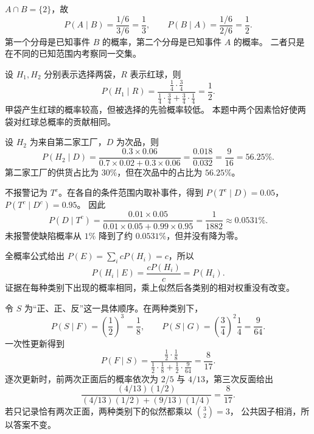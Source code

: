 \documentclass[UTF8]{ctexart}
\begin{document}
\begin{solve}
$A\cap B=\{2\}$，故
\[
  P(A\mid B)=\frac{1/6}{3/6}=\frac13,
  \qquad P(B\mid A)=\frac{1/6}{2/6}=\frac12.
\]
第一个分母是已知事件 $B$ 的概率，第二个分母是已知事件 $A$ 的概率。
二者只是在不同的已知范围内考察同一交集。
\end{solve}

\begin{solve}
设 $H_1,H_2$ 分别表示选择两袋，$R$ 表示红球，则
\[
  P(H_1\mid R)
  =\frac{\frac14\cdot\frac34}
  {\frac14\cdot\frac34+\frac34\cdot\frac14}=\frac12.
\]
甲袋产生红球的概率较高，但被选择的先验概率较低。
本题中两个因素恰好使两袋对红球总概率的贡献相同。
\end{solve}

\begin{solve}
设 $H_2$ 为来自第二家工厂，$D$ 为次品，则
\[
  P(H_2\mid D)
  =\frac{0.3\times0.06}{0.7\times0.02+0.3\times0.06}
  =\frac{0.018}{0.032}=\frac9{16}=56.25\%.
\]
第二家工厂的供货占比为 $30\%$，但在次品中的占比为 $56.25\%$。
\end{solve}

\begin{solve}
不报警记为 $T^c$。在各自的条件范围内取补事件，得到
$P(T^c\mid D)=0.05$，$P(T^c\mid D^c)=0.95$。
因此
\[
  P(D\mid T^c)
  =\frac{0.01\times0.05}{0.01\times0.05+0.99\times0.95}
  =\frac1{1882}\approx0.0531\%.
\]
未报警使缺陷概率从 $1\%$ 降到了约 $0.0531\%$，但并没有降为零。
\end{solve}

\begin{solve}
全概率公式给出 $P(E)=\sum_i cP(H_i)=c$，所以
\[
  P(H_i\mid E)=\frac{cP(H_i)}{c}=P(H_i).
\]
证据在每种类别下出现的概率相同，乘上似然后各类别的相对权重没有改变。
\end{solve}

\begin{solve}
令 $S$ 为“正、正、反”这一具体顺序。在两种类别下，
\[
  P(S\mid F)=\left(\frac12\right)^3=\frac18,
  \qquad P(S\mid G)=\left(\frac34\right)^2\frac14=\frac9{64}.
\]
一次性更新得到
\[
  P(F\mid S)=\frac{\frac12\cdot\frac18}
  {\frac12\cdot\frac18+\frac12\cdot\frac9{64}}=\frac8{17}.
\]
逐次更新时，前两次正面后的概率依次为 $2/5$ 与 $4/13$，第三次反面给出
\[
  \frac{(4/13)(1/2)}{(4/13)(1/2)+(9/13)(1/4)}=\frac8{17}.
\]
若只记录恰有两次正面，两种类别下的似然都乘以 $\binom32=3$，
公共因子相消，所以答案不变。
\end{solve}
\end{document}
